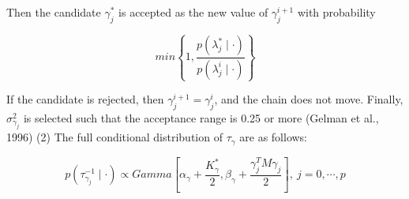 \documentclass[
journal=jacsat, %
manuscript=article]{achemso}
\begin{document}
\begin{CJK*}{UTF8}{song}
Then the candidate $\gamma_j^{\ast}$ is accepted as the new value of $\gamma_j^{i+1}$ with probability
 
\begin{equation}
	min \left \{1,\frac{p(\lambda_j^{\ast} \mid \cdot)}{p(\lambda_j^i \mid \cdot)} \right \} \nonumber
\end{equation}

If the candidate is rejected, then  $\gamma_j^{i+1}=\gamma_j^i$, and the chain does not move. Finally, $\sigma_{\gamma_j}^2$ is selected such that the acceptance range is 0.25 or more (Gelman et al., 1996)
(2)	The full conditional distribution of $\tau_{\gamma}$ are as follows:

\begin{equation}
	p(\tau_{\gamma_j}^{-1} \mid \cdot) \propto Gamma \left [ \alpha_{\gamma} + \frac{K_{\gamma}^{\ast}}{2}, \beta_{\gamma} + \frac{\gamma_{j}^T M \gamma_{j}}{2} \right ], \  j=0, \cdots , p
\end{equation}

%

\end{CJK*}
\end{document}

